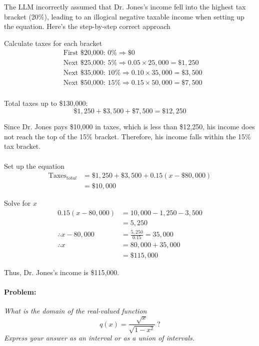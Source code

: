 \documentclass[11pt,a4paper]{article}
\begin{document}
\begin{tcolorbox}[colback=gray!10, colframe=black, title=\textbf{Step-by-Step Analysis}, fonttitle=\bfseries]
\footnotesize
The LLM incorrectly assumed that Dr. Jones's income fell into the highest tax bracket (20\%), leading to an illogical negative taxable income when setting up the equation. Here's the step-by-step correct approach

Calculate taxes for each bracket
\[
\begin{aligned}
&\text{First \$20,000: } 0\% \Rightarrow \$0 \\
&\text{Next \$25,000: } 5\% \Rightarrow 0.05 \times 25,000 = \$1,250 \\
&\text{Next \$35,000: } 10\% \Rightarrow 0.10 \times 35,000 = \$3,500 \\
&\text{Next \$50,000: } 15\% \Rightarrow 0.15 \times 50,000 = \$7,500 \\
\end{aligned}
\]
   
Total taxes up to \$130,000:
\[
\$1,250 + \$3,500 + \$7,500 = \$12,250
\]

Since Dr. Jones pays \$10,000 in taxes, which is less than \$12,250, his income does not reach the top of the 15\% bracket. Therefore, his income falls within the 15\% tax bracket.
\\
\\
Set up the equation
\begin{align*}
\text{Taxes}_{total} &= \$1,250 + \$3,500 + 0.15(x - \$80,000) \\
&= \$10,000
\end{align*}

Solve for \( x \)
\begin{align*}
0.15(x - 80,000) &= 10,000 - 1,250 - 3,500 \\
&= 5,250 \\
\therefore x - 80,000 &= \frac{5,250}{0.15} = 35,000 \\
\therefore x &= 80,000 + 35,000 \\ &= \$115,000
\end{align*}

Thus, Dr. Jones's income is \$115,000.
\end{tcolorbox}

\paragraph{Problem:} \textit{What is the domain of the real-valued function
\[
q(x) = \dfrac{\sqrt{x}}{\sqrt{1 - x^2}}~?
\]
Express your answer as an interval or as a union of intervals.}
\end{document}
